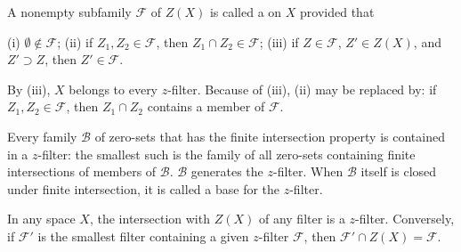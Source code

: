 A nonempty subfamily $\mathcal{F}$ of $Z(X)$ is called a  on $X$ provided that

(i) $\emptyset \notin \mathcal{F}$;
(ii) if $Z_1, Z_2 \in \mathcal{F}$, then $Z_1 \cap Z_2 \in \mathcal{F}$;
(iii) if $Z \in \mathcal{F}$, $Z' \in Z(X)$, and $Z' \supset Z$, then $Z' \in \mathcal{F}$.

By (iii), $X$ belongs to every $z$-filter. Because of (iii), (ii) may be replaced by: if $Z_1, Z_2 \in \mathcal{F}$, then $Z_1 \cap Z_2$ contains a member of $\mathcal{F}$.

Every family $\mathcal{B}$ of zero-sets that has the finite intersection property is contained in a $z$-filter: the smallest such is the family of all zero-sets containing finite intersections of members of $\mathcal{B}$. $\mathcal{B}$ generates the $z$-filter. When $\mathcal{B}$ itself is closed under finite intersection, it is called a base for the $z$-filter.

In any space $X$, the intersection with $Z(X)$ of any filter is a $z$-filter. Conversely, if $\mathcal{F}'$ is the smallest filter containing a given $z$-filter $\mathcal{F}$, then $\mathcal{F}' \cap Z(X) = \mathcal{F}$.
